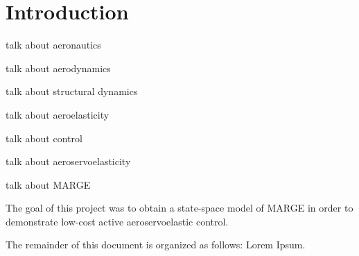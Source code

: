\chapter{Introduction}
\label{ch:introduction}

talk about aeronautics

talk about aerodynamics

talk about structural dynamics

talk about aeroelasticity

talk about control

talk about aeroservoelasticity

talk about MARGE

The goal of this project was to obtain a state-space model of MARGE in order to demonstrate low-cost active aeroservoelastic control.

The remainder of this document is organized as follows: Lorem Ipsum.